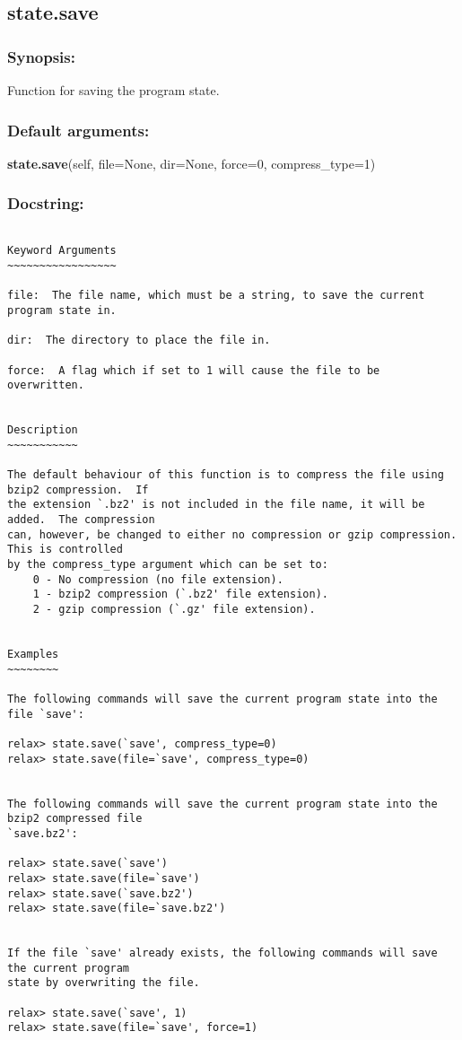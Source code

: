 \newpage

\subsection{state.save}


\subsubsection{Synopsis:}

Function for saving the program state.

\subsubsection{Default arguments:}

\textsf{\textbf{state.save}(self, file=None, dir=None, force=0, compress\_type=1)
}


\subsubsection{Docstring:}

{\scriptsize
\begin{verbatim}

Keyword Arguments
~~~~~~~~~~~~~~~~~

file:  The file name, which must be a string, to save the current program state in.

dir:  The directory to place the file in.

force:  A flag which if set to 1 will cause the file to be overwritten.


Description
~~~~~~~~~~~

The default behaviour of this function is to compress the file using bzip2 compression.  If
the extension `.bz2' is not included in the file name, it will be added.  The compression
can, however, be changed to either no compression or gzip compression.  This is controlled
by the compress_type argument which can be set to:
    0 - No compression (no file extension).
    1 - bzip2 compression (`.bz2' file extension).
    2 - gzip compression (`.gz' file extension).


Examples
~~~~~~~~

The following commands will save the current program state into the file `save':

relax> state.save(`save', compress_type=0)
relax> state.save(file=`save', compress_type=0)


The following commands will save the current program state into the bzip2 compressed file
`save.bz2':

relax> state.save(`save')
relax> state.save(file=`save')
relax> state.save(`save.bz2')
relax> state.save(file=`save.bz2')


If the file `save' already exists, the following commands will save the current program
state by overwriting the file.

relax> state.save(`save', 1)
relax> state.save(file=`save', force=1)
\end{verbatim}
}



